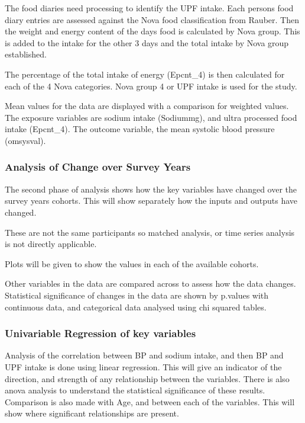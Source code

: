 \documentclass[
]{article}
\begin{document}
The food diaries need processing to identify the UPF intake. Each
persons food diary entries are assessed against the Nova food
classification from Rauber. Then the weight and energy content of the
days food is calculated by Nova group. This is added to the intake for
the other 3 days and the total intake by Nova group established.

The percentage of the total intake of energy (Epcnt\_4) is then
calculated for each of the 4 Nova categories. Nova group 4 or UPF intake
is used for the study.

Mean values for the data are displayed with a comparison for weighted
values. The exposure variables are sodium intake (Sodiummg), and ultra
processed food intake (Epcnt\_4). The outcome variable, the mean
systolic blood pressure (omsysval).

\hypertarget{analysis-of-change-over-survey-years}{%
\subsubsection{Analysis of Change over Survey
Years}\label{analysis-of-change-over-survey-years}}

The second phase of analysis shows how the key variables have changed
over the survey years cohorts. This will show separately how the inputs
and outputs have changed.

These are not the same participants so matched analysis, or time series
analysis is not directly applicable.

Plots will be given to show the values in each of the available cohorts.

Other variables in the data are compared across to assess how the data
changes. Statistical significance of changes in the data are shown by
p.values with continuous data, and categorical data analysed using chi
squared tables.

\hypertarget{univariable-regression-of-key-variables}{%
\subsubsection{Univariable Regression of key
variables}\label{univariable-regression-of-key-variables}}

Analysis of the correlation between BP and sodium intake, and then BP
and UPF intake is done using linear regression. This will give an
indicator of the direction, and strength of any relationship between the
variables. There is also anova analysis to understand the statistical
significance of these results. Comparison is also made with Age, and
between each of the variables. This will show where significant
relationships are present.
\end{document}
